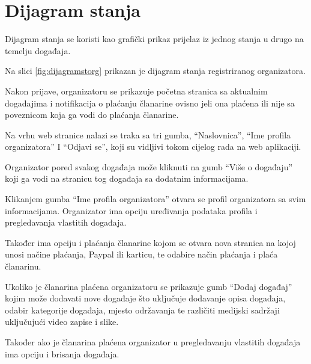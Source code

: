 			
		\eject
		
		\section{Dijagram stanja}
			\normalfont\noindent Dijagram stanja se koristi kao grafički prikaz prijelaz iz jednog stanja u drugo na temelju događaja.
			
			\medskip
			
			\normalfont\noindent Na slici \ref{fig:dijagramstorg} prikazan je dijagram stanja registriranog organizatora.
			
			\medskip
			
			\normalfont\noindent Nakon prijave, organizatoru se prikazuje početna stranica sa aktualnim događajima i notifikacija o plaćanju članarine ovisno jeli ona plaćena ili nije sa poveznicom koja ga vodi do plaćanja članarine.
			
			\medskip
			
			\normalfont\noindent Na vrhu web stranice nalazi se traka sa tri gumba, “Naslovnica”, “Ime profila organizatora” I “Odjavi se”, koji su vidljivi tokom cijelog rada na web aplikaciji.
			
			\medskip
			
			\normalfont\noindent Organizator pored svakog događaja može kliknuti na gumb “Više o događaju” koji ga vodi na stranicu tog događaja sa dodatnim informacijama.
			
			\medskip
			
			\normalfont\noindent Klikanjem gumba “Ime profila organizatora” otvara se profil organizatora sa svim informacijama. Organizator ima opciju uređivanja podataka profila i pregledavanja vlastitih događaja.
			
			\medskip
			
			\normalfont\noindent Također ima opciju i plaćanja članarine kojom se otvara nova stranica na kojoj unosi načine plaćanja, Paypal ili karticu, te odabire način plaćanja i plaća članarinu.
			
			\medskip
			
			\normalfont\noindent Ukoliko je članarina plaćena organizatoru se prikazuje gumb “Dodaj događaj” kojim može dodavati nove događaje što uključuje dodavanje opisa događaja, odabir kategorije događaja, mjesto održavanja te različiti medijski sadržaji uključujući video zapise i slike.
			
			\medskip
			
			\normalfont\noindent Također ako je članarina plaćena organizator u pregledavanju vlastitih događaja ima opciju i brisanja događaja.
			
